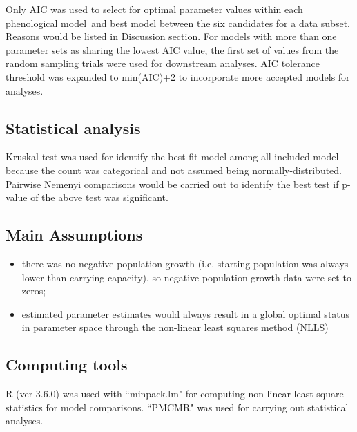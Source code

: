 \documentclass[a4paper, 11pt]{article}
\newcommand{\pml}{phenological model}
\begin{document}
	Only AIC\autocite{johnson2004model,akaike1998information,burnhamdr} was used to select for optimal parameter values within each \pml\ and best model between the six candidates for a data subset.  Reasons would be listed in Discussion section.  For models with more than one parameter sets as sharing the lowest AIC value, the first set of values from the random sampling trials were used for downstream analyses.  AIC tolerance threshold was expanded to min(AIC)+2\autocite{burnham2004multimodel} to incorporate more accepted models for analyses.
	
	\subsection*{Statistical analysis}
	Kruskal test was used for identify the best-fit model among all included model because the count was categorical and not assumed being normally-distributed.  Pairwise Nemenyi comparisons would be carried out to identify the best test if p-value of the above test was significant.
	
	\subsection*{Main Assumptions}
	\begin{itemize}
		\item there was no negative population growth (i.e. starting population was always lower than carrying capacity), so negative population growth data were set to zeros;
		\item estimated parameter estimates would always result in a global optimal status in parameter space through the non-linear least squares method (NLLS)
	\end{itemize}
	
	\subsection*{Computing tools}
	R (ver 3.6.0)\autocite{Rcore} was used with ``minpack.lm"\autocite{minpacklm} for computing non-linear least square statistics for model comparisons. ``PMCMR"\autocite{PMCMR} was used for carrying out statistical analyses.
	
\end{document}

